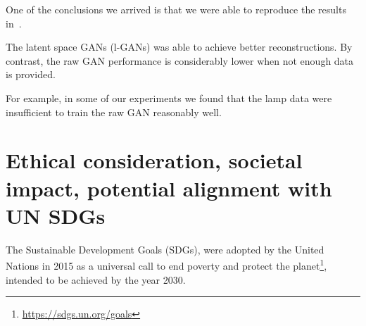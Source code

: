\documentclass[12pt]{article}
\newcommand{\contentdescription}[1]{}
\begin{document}
    One of the conclusions we arrived is that we were able to reproduce the results in~\cite{pmlr-v80-achlioptas18a}.

    The latent space GANs (l-GANs) was able to achieve better reconstructions.
    By contrast, the raw GAN performance is considerably lower when not enough data is provided.

    For example, in some of our experiments we found that the lamp data were insufficient to train the raw GAN reasonably well.


    \section{Ethical consideration, societal impact, potential alignment with UN SDGs}
    \contentdescription{
        Ethical consideration, societal impact, potential alignment with UN SDGs (5-10\%):
        Think and research!
        Are there any ethical considerations for the original paper, its problem or method, its way of conducting experiments?
        How about your task, your datasets, and the experiments you did?
        What societal impact can you imagine about the original paper and its contributions and results?
        How about your project report?
        How do you think this paper can push the UN SDG targets?
    }

    The Sustainable Development Goals (SDGs), were adopted by the United Nations in 2015 as a universal call
    to end poverty and protect the planet\footnote{\url{https://sdgs.un.org/goals}}, intended to be achieved by the year 2030.
\end{document}
